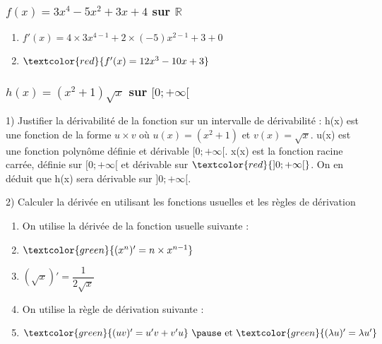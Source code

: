 \documentclass[t]{beamer}
\begin{document}
	\begin{frame}
		\frametitle{$f(x) = 3x^4 - 5x^2 + 3x + 4 $ sur $\mathbb{R}$}
		\pause
		\begin{enumerate}[]
			\item \(f'(x) = 4 \times 3x^{4-1} + 2 \times (-5)x^{2-1} + 3 + 0 \)
			\pause
			\item \(\textcolor{red}{f'(x) = 12x^{3} -10x + 3} \)
			\pause
		\end{enumerate}
	\end{frame}

	\begin{frame}
		\frametitle{$h(x) = (x^2+1)\sqrt{x} $ sur $[0;+\infty[$}
			\begin{block}{1) Justifier la dérivabilité de la fonction sur un intervalle de dérivabilité :}
			\pause
			h(x) est une fonction de la forme $u \times v$ où $u(x)= (x^2+1) $ et $v(x)= \sqrt{x}$. u(x) est une fonction polynôme définie et dérivable $[0;+\infty[$. x(x) est la fonction racine carrée, définie sur $[0;+\infty[$ et dérivable sur $\textcolor{red}{]0;+\infty[}$. On en déduit que h(x) sera dérivable sur $]0;+\infty[$.
			\pause
		\end{block}

		\begin{block}{2) Calculer la dérivée en utilisant les fonctions usuelles et les règles de dérivation}
			\pause
			\begin{enumerate}[]
				\item On utilise la dérivée de la fonction usuelle suivante :
				\pause
				\item \(\textcolor{green}{ (x^n)' = n \times x^{n-1} }\)
				\pause
				\item \((\sqrt{x})' = \dfrac{1}{2\sqrt{x}} \)
				\pause
				\item On utilise la règle de dérivation suivante :
				\pause
				\item \(\textcolor{green}{(uv)' = u'v + v'u}$ \pause et $\textcolor{green}{ (\lambda u)' = \lambda u'}\)
				\pause
			\end{enumerate}
		\end{block}
	\end{frame}
\end{document}
